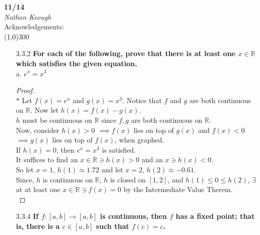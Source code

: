 \documentclass[a4paper]{article}
\newcommand{\bb}{\textbf}
\newcommand{\real}{\mathbb{R}}
\begin{document}
    \begin{center}
        \Large \textbf{11/14} \\
        \large \textit{Nathan Keough} \\
        Acknowledgements: \emph{} \vspace{.5pc} \\ \line(1,0){300} 
        \vspace{1pc}
    \end{center} 
    
    \begin{flushleft}


        \begin{enumerate}[a.]
            \item [3.3.2] \bb{For each of the following, prove that there is at least one $x\in \real$ which  satisfies the given equation.}\\
            a. $e^x = x^3$ \\  
            \begin{proof}\mbox{}\\* 
                Let $f(x) = e^x$ and $g(x) = x^3$. Notice that $f$ and $g$ are both continuous on $\real$. Now let $h(x) = f(x) - g(x)$. \\
                $h$ must be continuous on $\real$ since $f,g$ are both continuous on $\real$.\\
                Now, consider $h(x) > 0$ $\implies f(x)$ lies on top of $g(x)$ and $f(x) < 0$ $\implies g(x)$ lies on top of $f(x)$, when graphed.\\
                If $h(x) = 0$, then $e^x = x^3$ is satisfied.\\
                It suffices to find an $x \in \real \ni h(x) > 0$ and an $x \ni h(x) < 0$.\\
                So let $x = 1$, $h(1) \approx 1.72$ and let $x = 2$, $h(2) \approx -0.61$. \\
                Since, $h$ is continuous on $\real$, $h$ is closed on $[1,2]$, and $h(1) \leq 0 \leq h(2)$, $\exists$ at at least one $x\in \real \ni f(x) = 0$ by the Intermediate Value Therem. \\
            \end{proof}

            \item [3.3.4] \bb{If $f : [a, b] \to [a, b]$ is continuous, then $f$ has a fixed point; that is, there is a $c \in [a, b]$ such that $f(c) = c$.} \\
            

\end{enumerate}
\end{flushleft}
\end{document}
